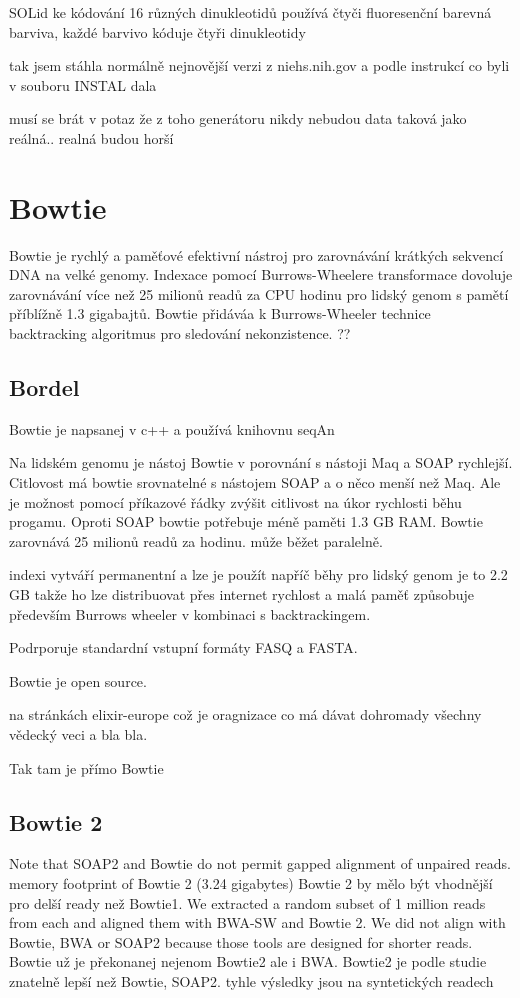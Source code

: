 \documentclass[czech,DP]{thesiskiv}
\begin{document}
SOLid ke kódování 16 různých dinukleotidů používá čtyči fluoresenční barevná barviva, každé barvivo kóduje čtyři dinukleotidy
 


tak jsem stáhla normálně nejnovější verzi z niehs.nih.gov a podle instrukcí co byli v souboru INSTAL dala %


musí se brát v potaz že z toho generátoru nikdy nebudou data taková jako reálná.. realná budou horší 




\section{Bowtie}
Bowtie je rychlý a paměťové efektivní nástroj pro zarovnávání krátkých sekvencí DNA na velké genomy. Indexace pomocí Burrows-Wheelere transformace dovoluje zarovnávání více než 25 milionů readů za CPU hodinu pro lidský genom s pamětí příblížně 1.3 gigabajtů. Bowtie přidáváa k Burrows-Wheeler technice backtracking algoritmus pro sledování nekonzistence. ??


\subsection{Bordel}
Bowtie je napsanej v c++ a používá knihovnu seqAn

Na lidském genomu je nástoj Bowtie v porovnání s nástoji Maq a SOAP rychlejší. 
Citlovost má bowtie srovnatelné s nástojem SOAP a o něco menší než Maq. Ale je možnost pomocí příkazové řádky zvýšit citlivost na úkor rychlosti běhu progamu.
Oproti SOAP bowtie potřebuje méně paměti 1.3 GB RAM. 
Bowtie zarovnává  25 milionů readů za hodinu. může běžet paralelně.

indexi vytváří permanentní a lze je použít napříč běhy 
pro lidský genom je to 2.2 GB takže ho lze distribuovat přes internet
rychlost a malá paměť způsobuje především Burrows wheeler v kombinaci s backtrackingem.

Podrporuje standardní vstupní formáty FASQ a FASTA.

Bowtie je open source.

 
na stránkách elixir-europe což je oragnizace co má dávat dohromady všechny vědecký veci a bla bla.



Tak tam je přímo Bowtie \cite{bowtie}

\subsection{Bowtie 2}
Note that SOAP2 and Bowtie do not permit gapped alignment of unpaired reads.
 memory footprint of Bowtie 2 (3.24 gigabytes)
 Bowtie 2 by mělo být vhodnější pro delší ready než Bowtie1.
 We extracted a random subset of 1 million reads from each and aligned them with BWA-SW and Bowtie 2. We did not align with Bowtie, BWA or SOAP2 because those tools are designed for shorter reads.
Bowtie už je překonanej nejenom Bowtie2 ale i BWA.
Bowtie2 je podle studie znatelně lepší než Bowtie, SOAP2.
tyhle výsledky jsou na syntetických readech
\end{document}
